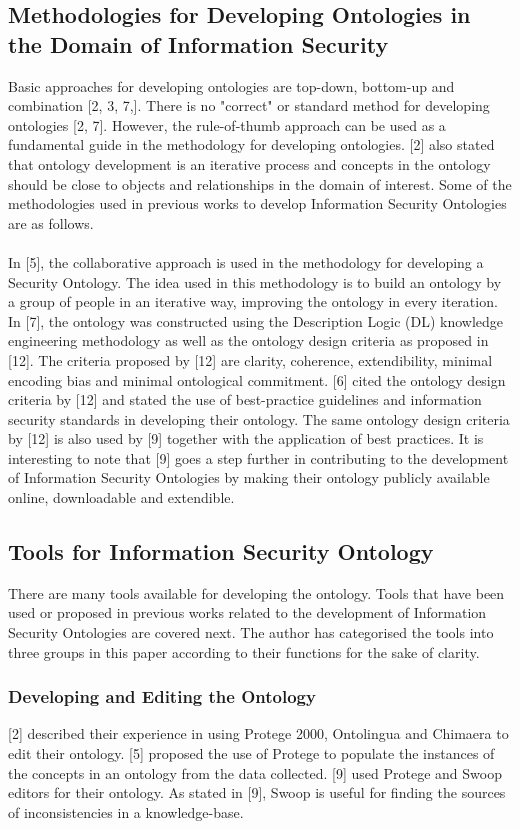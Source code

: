 \documentclass[conference, compsoc]{IEEEtran}
\begin{document}
\subsection{Methodologies for Developing Ontologies in the Domain of Information Security}
Basic approaches for developing ontologies are top-down, bottom-up and combination [2, 3, 7,]. There is no "correct" or standard method for developing ontologies [2, 7]. However, the rule-of-thumb approach can be used as a fundamental guide in the methodology for developing ontologies. [2] also stated that ontology development is an iterative process and concepts in the ontology should be close to objects and relationships in the domain of interest. Some of the methodologies used in previous works to develop Information Security Ontologies are as follows.\\
\\
In [5], the collaborative approach is used in the methodology for developing a Security Ontology. The idea used in this methodology is to build an ontology by a group of people in an iterative way, improving the ontology in every iteration. In [7], the ontology was constructed using the Description Logic (DL) knowledge engineering methodology as well as the ontology design criteria as proposed in [12]. The criteria proposed by [12] are clarity, coherence, extendibility, minimal encoding bias and minimal ontological commitment. [6] cited the ontology design criteria by [12] and stated the use of best-practice guidelines and information security standards in developing their ontology. The same ontology design criteria by [12] is also used by [9] together with the application of best practices. It is interesting to note that [9] goes a step further in contributing to the development of Information Security Ontologies by making their ontology publicly available online, downloadable and  extendible.


\subsection{Tools for Information Security Ontology}
There are many tools available for developing the ontology. Tools that have been used or proposed in previous works related to the development of Information Security Ontologies are covered next. The author has categorised the tools into three groups in this paper according to their functions for the sake of clarity.

\subsubsection{Developing and Editing the Ontology}
[2] described their experience in using Protege 2000, Ontolingua and Chimaera to edit their ontology. [5] proposed the use of Protege to populate the instances of the concepts in an ontology from the data collected. [9] used Protege and Swoop editors for their ontology. As stated in [9], Swoop is useful for finding the sources of inconsistencies in a knowledge-base.
\end{document}
